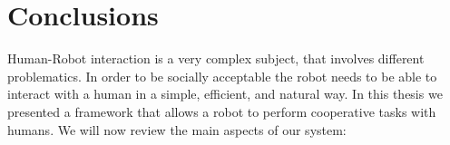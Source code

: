 
\chapter{Conclusions} %

\label{chapter-conclusions} %


Human-Robot interaction is a very complex subject, that involves different problematics. In order to be socially acceptable the robot needs to be able to interact with a human in a simple, efficient, and natural way. In this thesis we presented a framework that allows a robot to perform cooperative tasks with humans. We will now review the main aspects of our system:

